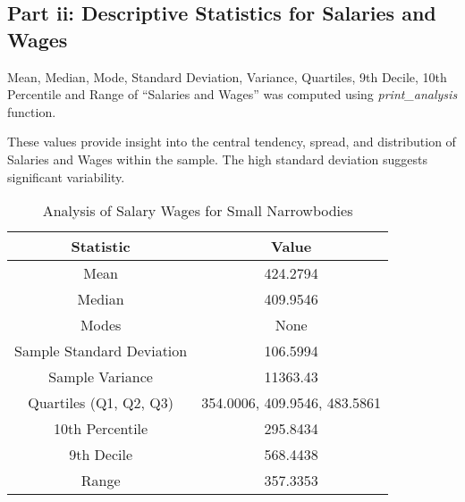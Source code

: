 \subsection{Part ii: Descriptive Statistics for Salaries and Wages}

Mean, Median, Mode, Standard Deviation, Variance, Quartiles, 9th Decile, 10th Percentile and Range of ``Salaries and Wages”
was computed using \textit{print\_analysis} function.



These values provide insight into the central tendency, spread, and distribution of Salaries and Wages within the sample. The high standard deviation suggests significant variability.
\begin{table}[H]
    \centering
    \caption{Analysis of Salary Wages for Small Narrowbodies}
    \begin{tabular}{|c|c|}
        \hline
        Statistic                 & Value                        \\
        \hline
        Mean                      & 424.2794                     \\
        Median                    & 409.9546                     \\
        Modes                     & None                         \\
        Sample Standard Deviation & 106.5994                     \\
        Sample Variance           & 11363.43                     \\
        Quartiles (Q1, Q2, Q3)    & 354.0006, 409.9546, 483.5861 \\
        10th Percentile           & 295.8434                     \\
        9th Decile                & 568.4438                     \\
        Range                     & 357.3353                     \\
        \hline
    \end{tabular}
\end{table}

